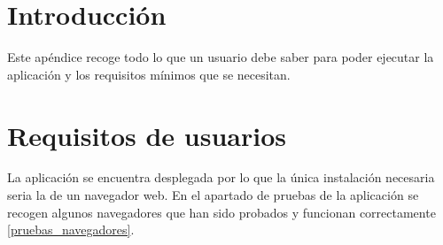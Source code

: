 
\section{Introducción}


Este apéndice recoge todo lo que un usuario debe saber para poder ejecutar la aplicación y los requisitos mínimos que se necesitan. 

\section{Requisitos de usuarios}
La aplicación se encuentra desplegada por lo que la única instalación necesaria seria la de un navegador web. En el apartado de pruebas de la aplicación se recogen algunos navegadores que han sido probados y funcionan correctamente \ref{pruebas_navegadores}.

